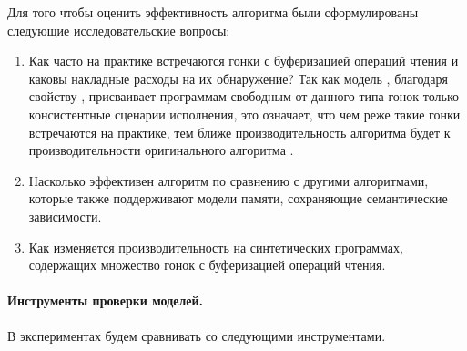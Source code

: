 Для того чтобы оценить эффективность алгоритма \wmc были 
сформулированы следующие исследовательские вопросы:
\begin{enumerate}

  \item Как часто на практике встречаются гонки с буферизацией операций чтения
    и каковы накладные расходы на их обнаружение?
    Так как модель \WkmS, благодаря свойству \LBRF, присваивает 
    программам свободным от данного типа гонок только \RCMM консистентные сценарии исполнения, 
    это означает, что чем реже такие гонки встречаются на практике, 
    тем ближе производительность алгоритма \wmc 
    будет к производительности оригинального алгоритма \genmc.

  \item Насколько эффективен алгоритм \wmc по сравнению 
    с другими алгоритмами, которые также поддерживают 
    модели памяти, сохраняющие семантические зависимости. 

  \item Как изменяется производительность \wmc на синтетических программах, 
    содержащих множество гонок с буферизацией операций чтения. 
    
\end{enumerate}

\paragraph{Инструменты проверки моделей.}

В экспериментах будем сравнивать \wmc со следующими инструментами.

